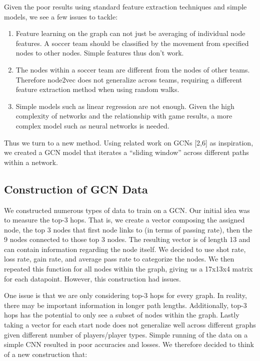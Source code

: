 Given the poor results using standard feature extraction techniques and simple models, we see a few issues to tackle:

\begin{enumerate}

    \item Feature learning on the graph can not just be averaging of individual node features. A soccer team should be classified by the movement from specified nodes to other nodes. Simple features thus don't work. 


    \item The nodes within a soccer team are different from the nodes of other teams. Therefore node2vec does not generalize across teams, requiring a different feature extraction method when using random walks. 


    \item Simple models such as linear regression are not enough. Given the high complexity of networks and the relationship with game results, a more complex model such as neural networks is needed. 

\end{enumerate}

Thus we turn to a new method. Using related work on GCNs [2,6] as inspiration, we created a GCN model that iterates a ``sliding window'' across different paths within a network. 

\subsection{Construction of GCN Data}

We constructed numerous types of data to train on a GCN. Our initial idea was to measure the top-3 hops. That is, we create a vector composing the assigned node, the top 3 nodes that first node links to (in terms of passing rate), then the 9 nodes connected to those top 3 nodes. The resulting vector is of length 13 and can contain information regarding the node itself. We decided to use shot rate, loss rate, gain rate, and average pass rate to categorize the nodes. We then repeated this function for all nodes within the graph, giving us a 17x13x4 matrix for each datapoint. However, this construction had issues. 

One issue is that we are only considering top-3 hops for every graph. In reality, there may be important information in longer path lengths. Additionally, top-3 hops has the potential to only see a subset of nodes within the graph. Lastly taking a vector for each start node does not generalize well across different graphs given different number of players/player types. Simple running of the data on a simple CNN resulted in poor accuracies and losses. We therefore decided to think of a new construction that: 

